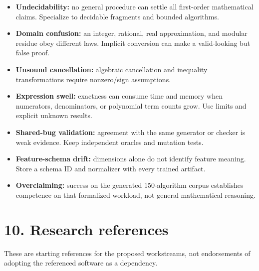 \documentclass[
  10pt,
]{article}
\providecommand{\tightlist}{%
  \setlength{\itemsep}{0pt}\setlength{\parskip}{0pt}}
\begin{document}
\begin{itemize}
\tightlist
\item
  \textbf{Undecidability:} no general procedure can settle all
  first-order mathematical claims. Specialize to decidable fragments and
  bounded algorithms.
\item
  \textbf{Domain confusion:} an integer, rational, real approximation,
  and modular residue obey different laws. Implicit conversion can make
  a valid-looking but false proof.
\item
  \textbf{Unsound cancellation:} algebraic cancellation and inequality
  transformations require nonzero/sign assumptions.
\item
  \textbf{Expression swell:} exactness can consume time and memory when
  numerators, denominators, or polynomial term counts grow. Use limits
  and explicit unknown results.
\item
  \textbf{Shared-bug validation:} agreement with the same generator or
  checker is weak evidence. Keep independent oracles and mutation tests.
\item
  \textbf{Feature-schema drift:} dimensions alone do not identify
  feature meaning. Store a schema ID and normalizer with every trained
  artifact.
\item
  \textbf{Overclaiming:} success on the generated 150-algorithm corpus
  establishes competence on that formalized workload, not general
  mathematical reasoning.
\end{itemize}

\section{10. Research references}\label{research-references}

These are starting references for the proposed workstreams, not
endorsements of adopting the referenced software as a dependency.
\end{document}
